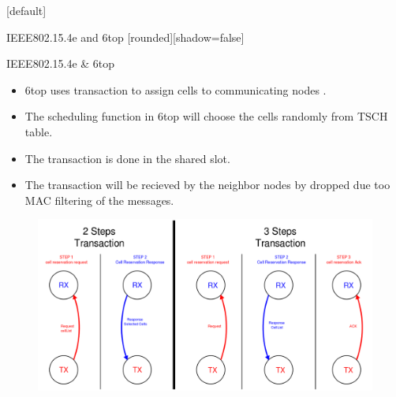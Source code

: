 \documentclass{beamer}
\makeatletter
\newenvironment{withoutheadline}{
        \setbeamertemplate{headline}[default]
        \def\beamer@entrycode{\vspace*{-\headheight}}
    }{}
\makeatother
\begin{document}
\begin{withoutheadline}
\begin{frame}{IEEE802.15.4e and 6top}
[rounded][shadow=false]




\begin{block}{IEEE802.15.4e \& 6top}
    \begin{itemize}
    \item 6top uses transaction to assign cells to communicating nodes . 
    \item The scheduling function in 6top will choose the cells randomly from TSCH table.
    \item The transaction is done in the shared slot. 
    \item The transaction will be recieved by the neighbor nodes by dropped due too MAC filtering of the messages. 
    
    \end{itemize}
    \end{block}
    \centering
\begin{figure}[p]

\includegraphics[width=0.7\linewidth]{2,3steps.png}
\end{figure}

\end{frame}
\end{withoutheadline}
\end{document}
